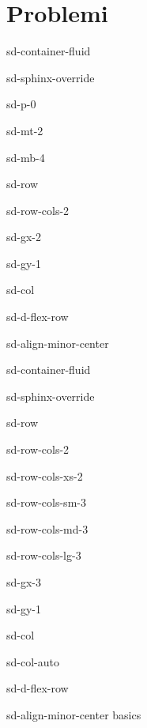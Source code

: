 \documentclass[letterpaper,10pt,italian]{jupyterBook}
\begin{document}
\section{Problemi}
\label{\detokenize{ch/precalculus/real-functions:problemi}}\label{\detokenize{ch/precalculus/real-functions:math-hs-precalculus-real-functions-problems}}
\sphinxAtStartPar
{}

\sphinxstepscope

\begin{sphinxuseclass}{sd-container-fluid}
\begin{sphinxuseclass}{sd-sphinx-override}
\begin{sphinxuseclass}{sd-p-0}
\begin{sphinxuseclass}{sd-mt-2}
\begin{sphinxuseclass}{sd-mb-4}
\begin{sphinxuseclass}{sd-row}
\begin{sphinxuseclass}{sd-row-cols-2}
\begin{sphinxuseclass}{sd-gx-2}
\begin{sphinxuseclass}{sd-gy-1}
\begin{sphinxuseclass}{sd-col}
\begin{sphinxuseclass}{sd-d-flex-row}
\begin{sphinxuseclass}{sd-align-minor-center}
\begin{sphinxuseclass}{sd-container-fluid}
\begin{sphinxuseclass}{sd-sphinx-override}
\begin{sphinxuseclass}{sd-row}
\begin{sphinxuseclass}{sd-row-cols-2}
\begin{sphinxuseclass}{sd-row-cols-xs-2}
\begin{sphinxuseclass}{sd-row-cols-sm-3}
\begin{sphinxuseclass}{sd-row-cols-md-3}
\begin{sphinxuseclass}{sd-row-cols-lg-3}
\begin{sphinxuseclass}{sd-gx-3}
\begin{sphinxuseclass}{sd-gy-1}
\begin{sphinxuseclass}{sd-col}
\begin{sphinxuseclass}{sd-col-auto}
\begin{sphinxuseclass}{sd-d-flex-row}
\begin{sphinxuseclass}{sd-align-minor-center}
\sphinxAtStartPar
basics


\end{sphinxuseclass}
\end{sphinxuseclass}
\end{sphinxuseclass}
\end{sphinxuseclass}
\end{sphinxuseclass}
\end{sphinxuseclass}
\end{sphinxuseclass}
\end{sphinxuseclass}
\end{sphinxuseclass}
\end{sphinxuseclass}
\end{sphinxuseclass}
\end{sphinxuseclass}
\end{sphinxuseclass}
\end{sphinxuseclass}
\end{sphinxuseclass}
\end{sphinxuseclass}
\end{sphinxuseclass}
\end{sphinxuseclass}
\end{sphinxuseclass}
\end{sphinxuseclass}
\end{sphinxuseclass}
\end{sphinxuseclass}
\end{sphinxuseclass}
\end{sphinxuseclass}
\end{sphinxuseclass}
\end{sphinxuseclass}
\end{document}
